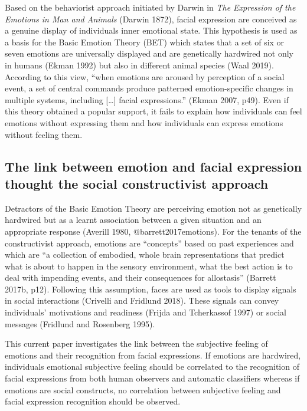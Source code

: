 \documentclass[conference,final,]{IEEEtran}
\begin{document}
Based on the behaviorist approach initiated by Darwin in \emph{The
Expression of the Emotions in Man and Animals} (Darwin 1872), facial
expression are conceived as a genuine display of individuals inner
emotional state. This hypothesis is used as a basis for the Basic
Emotion Theory (BET) which states that a set of six or seven emotions
are universally displayed and are genetically hardwired not only in
humans (Ekman 1992) but also in different animal species (Waal 2019).
According to this view, ``when emotions are aroused by perception of a
social event, a set of central commands produce patterned
emotion-specific changes in multiple systems, including {[}\ldots{}{]}
facial expressions.'' (Ekman 2007, p49). Even if this theory obtained a
popular support, it fails to explain how individuals can feel emotions
without expressing them and how individuals can express emotions without
feeling them.

\hypertarget{the-link-between-emotion-and-facial-expression-thought-the-social-constructivist-approach}{%
\subsection{The link between emotion and facial expression thought the
social constructivist
approach}\label{the-link-between-emotion-and-facial-expression-thought-the-social-constructivist-approach}}

Detractors of the Basic Emotion Theory are perceiving emotion not as
genetically hardwired but as a learnt association between a given
situation and an appropriate response (Averill 1980,
@barrett2017emotions). For the tenants of the constructivist approach,
emotions are ``concepts'' based on past experiences and which are ``a
collection of embodied, whole brain representations that predict what is
about to happen in the sensory environment, what the best action is to
deal with impending events, and their consequences for allostasis''
(Barrett 2017b, p12). Following this assumption, faces are used as tools
to display signals in social interactions (Crivelli and Fridlund 2018).
These signals can convey individuals' motivations and readiness (Frijda
and Tcherkassof 1997) or social messages (Fridlund and Rosenberg 1995).

This current paper investigates the link between the subjective feeling
of emotions and their recognition from facial expressions. If emotions
are hardwired, individuals emotional subjective feeling should be
correlated to the recognition of facial expressions from both human
observers and automatic classifiers whereas if emotions are social
constructs, no correlation between subjective feeling and facial
expression recognition should be observed.
\end{document}
